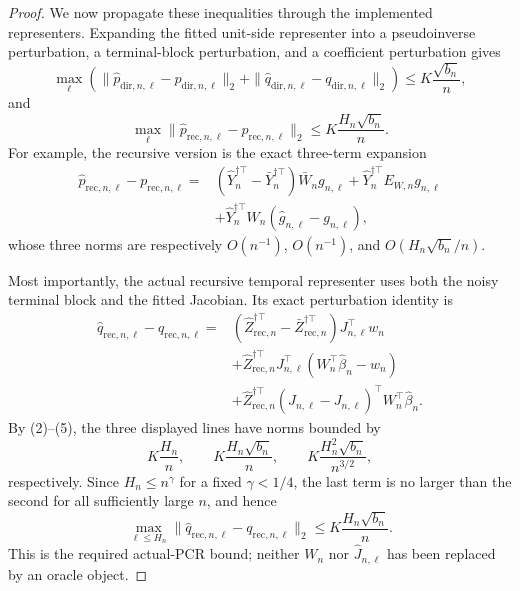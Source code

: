 \documentclass{article}
\begin{document}
\begin{proof}
We now propagate these inequalities through the implemented representers.  Expanding the fitted unit-side representer into a pseudoinverse perturbation, a terminal-block perturbation, and a coefficient perturbation gives
\[
 \max_\ell\left(
 \|\widehat p_{\mathrm{dir},n,\ell}-p_{\mathrm{dir},n,\ell}\|_2+
 \|\widehat q_{\mathrm{dir},n,\ell}-q_{\mathrm{dir},n,\ell}\|_2\right)
 \le K\frac{\sqrt{b_n}}n,
 \tag{8}
\]
and
\[
 \max_\ell\|\widehat p_{\mathrm{rec},n,\ell}-p_{\mathrm{rec},n,\ell}\|_2
 \le K\frac{H_n\sqrt{b_n}}n.
 \tag{9}
\]
For example, the recursive version is the exact three-term expansion
\[
\begin{aligned}
 \widehat p_{\mathrm{rec},n,\ell}-p_{\mathrm{rec},n,\ell}
={}&(\widehat Y_n^{\dagger\top}-\bar Y_n^{\dagger\top})
       \bar W_ng_{n,\ell}
 +\widehat Y_n^{\dagger\top}E_{W,n}g_{n,\ell}\\
 &+\widehat Y_n^{\dagger\top}W_n
       (\widehat g_{n,\ell}-g_{n,\ell}),
\end{aligned}
\]
whose three norms are respectively \(O(n^{-1})\), \(O(n^{-1})\), and
\(O(H_n\sqrt{b_n}/n)\).

Most importantly, the actual recursive temporal representer uses both the noisy terminal block and the fitted Jacobian.  Its exact perturbation identity is
\[
\begin{aligned}
 \widehat q_{\mathrm{rec},n,\ell}-q_{\mathrm{rec},n,\ell}
={}&(\widehat Z_{\mathrm{rec},n}^{\dagger\top}
       -\bar Z_{\mathrm{rec},n}^{\dagger\top})J_{n,\ell}^\top w_n\\
 &+\widehat Z_{\mathrm{rec},n}^{\dagger\top}J_{n,\ell}^\top
       (W_n^\top\widehat\beta_n-w_n)\\
 &+\widehat Z_{\mathrm{rec},n}^{\dagger\top}
       (\widehat J_{n,\ell}-J_{n,\ell})^\top
       W_n^\top\widehat\beta_n.
\end{aligned}
 \tag{10}
\]
By (2)--(5), the three displayed lines have norms bounded by
\[
 K\frac{H_n}{n},\qquad
 K\frac{H_n\sqrt{b_n}}n,\qquad
 K\frac{H_n^2\sqrt{b_n}}{n^{3/2}},
 \tag{11}
\]
respectively.  Since \(H_n\le n^\gamma\) for a fixed \(\gamma<1/4\), the last term is no larger than the second for all sufficiently large \(n\), and hence
\[
 \max_{\ell\le H_n}
 \|\widehat q_{\mathrm{rec},n,\ell}-q_{\mathrm{rec},n,\ell}\|_2
 \le K\frac{H_n\sqrt{b_n}}n.
 \tag{12}
\]
This is the required actual-PCR bound; neither \(W_n\) nor \(\widehat J_{n,\ell}\) has been replaced by an oracle object.


\end{proof}
\end{document}
